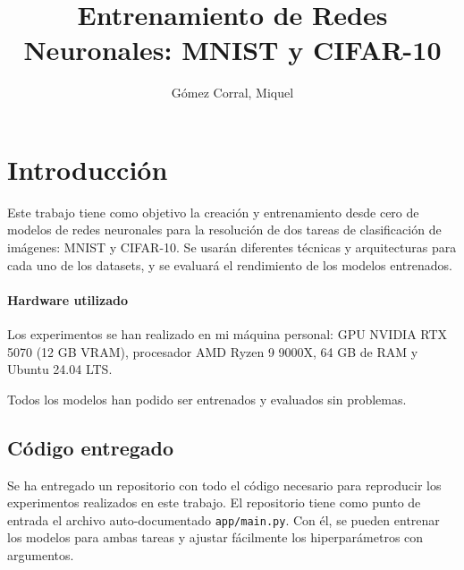 \documentclass[11pt,spanish,listoffigures,listoftables]{tfgetsinf}
\title{Entrenamiento de Redes Neuronales: MNIST y CIFAR-10}
\author{Gómez Corral, Miquel}
\begin{document}
 









\mainmatter

\chapter{Introducción}
Este trabajo tiene como objetivo la creación y entrenamiento desde cero de modelos de redes neuronales para la resolución de dos tareas de clasificación de imágenes: MNIST y CIFAR-10. Se usarán diferentes técnicas y arquitecturas para cada uno de los datasets, y se evaluará el rendimiento de los modelos entrenados.

\subsubsection{Hardware utilizado}
Los experimentos se han realizado en mi máquina personal: GPU NVIDIA RTX 5070 (12 GB VRAM), procesador AMD Ryzen 9 9000X, 64 GB de RAM y Ubuntu 24.04 LTS.

Todos los modelos han podido ser entrenados y evaluados sin problemas. 

\section{Código entregado}
Se ha entregado un repositorio con todo el código necesario para reproducir los experimentos realizados en este trabajo. El repositorio tiene como punto de entrada el archivo auto-documentado \texttt{app/main.py}. Con él, se pueden entrenar los modelos para ambas tareas y ajustar fácilmente los hiperparámetros con argumentos.
\end{document}
